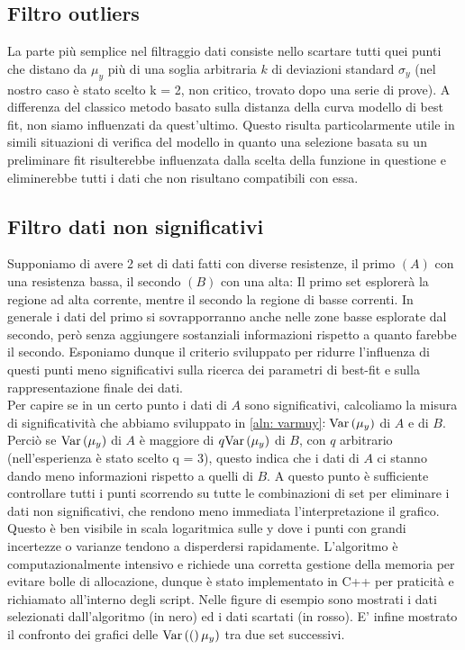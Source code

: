 \documentclass{article}[a4paper, oneside, 11pt]
\begin{document}
\subsection{Filtro outliers}
La parte più semplice nel filtraggio dati consiste nello scartare tutti quei
punti che distano da $\mu_y$ più di una soglia arbitraria $k$ di deviazioni
standard $\sigma_y$ (nel nostro caso è stato scelto k = 2, non critico,
trovato dopo una serie di prove). A differenza del classico metodo basato
sulla distanza della curva modello di best fit, non siamo influenzati da
quest’ultimo. Questo risulta particolarmente utile in simili situazioni di
verifica del modello in quanto una selezione basata su un preliminare fit
risulterebbe influenzata dalla scelta della funzione in questione e
eliminerebbe tutti i dati che non risultano compatibili con essa.

\subsection{Filtro dati non significativi}
Supponiamo di avere 2 set di dati fatti con diverse resistenze, il primo $(A)$
con una resistenza bassa, il secondo $(B)$ con una alta: Il primo set esplorerà
la regione ad alta corrente, mentre il secondo la regione di basse correnti.
In generale i dati del primo si sovrapporranno anche nelle zone basse esplorate
dal secondo, però senza aggiungere sostanziali informazioni rispetto a quanto
farebbe il secondo.
Esponiamo dunque il criterio sviluppato per ridurre l'influenza di questi
punti meno significativi sulla ricerca dei parametri di best-fit e sulla
rappresentazione finale dei dati.\\
Per capire se in un certo punto i dati di $A$ sono significativi, calcoliamo
la misura di significatività che abbiamo sviluppato in \eqref{aln: varmuy}$:
\text{Var}\left(\mu_y\right)$ di $A$ e di $B$. Perciò se $\text{Var}\left(\mu_y\right)$ di $A$ è maggiore di 
$q\text{Var}\left(\mu_y\right)$ di $B$, con $q$ arbitrario (nell’esperienza è stato scelto
q = 3), questo indica che i dati di $A$
ci stanno dando meno informazioni rispetto a quelli di $B$. A questo punto
è sufficiente controllare tutti i punti scorrendo su tutte le combinazioni
di set per eliminare i dati non significativi, che rendono meno
immediata l'interpretazione il grafico. Questo è ben visibile in scala
logaritmica sulle y dove i punti con grandi incertezze o varianze tendono
a disperdersi rapidamente.
L’algoritmo è computazionalmente intensivo e richiede una corretta gestione
della memoria per evitare bolle di allocazione, dunque è stato implementato
in C++ per praticità e richiamato all’interno degli script.
Nelle figure di esempio sono mostrati i dati selezionati dall’algoritmo
(in nero) ed i dati scartati (in rosso). 
E’ infine mostrato il confronto dei grafici delle $\text{Var}\left((\right)\mu_y)$
tra due set successivi.
\end{document}
